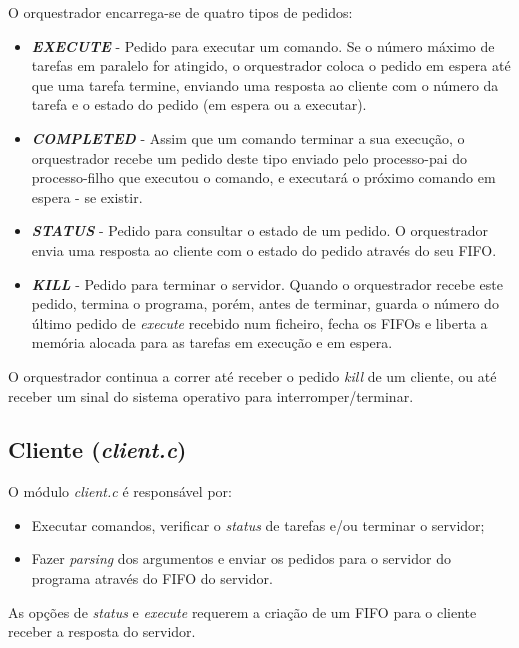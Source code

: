 \documentclass[a4paper,11pt]{scrreprt}
\begin{document}
        O orquestrador encarrega-se de quatro tipos de pedidos:
        \begin{itemize}
            \item \textit{\textbf{EXECUTE}} - Pedido para executar um comando.
            Se o número máximo de tarefas em paralelo for atingido, o orquestrador coloca o pedido em espera até que uma tarefa termine, enviando uma resposta ao cliente com o número da tarefa e o estado do pedido (em espera ou a executar).

            \item \textit{\textbf{COMPLETED}} - Assim que um comando terminar a sua execução, o orquestrador recebe um pedido deste tipo enviado pelo processo-pai do processo-filho que executou o comando, e executará o próximo comando em espera - se existir.

            \item \textit{\textbf{STATUS}} - Pedido para consultar o estado de um pedido.
            O orquestrador envia uma resposta ao cliente com o estado do pedido através do seu FIFO.

            \item \textit{\textbf{KILL}} - Pedido para terminar o servidor.
            Quando o orquestrador recebe este pedido, termina o programa, porém, antes de terminar, guarda o número do último pedido de \textit{execute} recebido num ficheiro, fecha os FIFOs e liberta a memória alocada para as tarefas em execução e em espera.
        \end{itemize}
        O orquestrador continua a correr até receber o pedido \textit{kill} de um cliente, ou até receber um sinal do sistema operativo para interromper/terminar.

        \subsection{Cliente (\textit{client.c})}
        O módulo \textit{client.c} é responsável por:
        \begin{itemize}
            \item Executar comandos, verificar o \textit{status} de tarefas e/ou terminar o servidor;
            \item Fazer \textit{parsing} dos argumentos e enviar os pedidos para o servidor do programa através do FIFO do servidor.
        \end{itemize}
        As opções de \textit{status} e \textit{execute} requerem a criação de um FIFO para o cliente receber a resposta do servidor.
\end{document}
